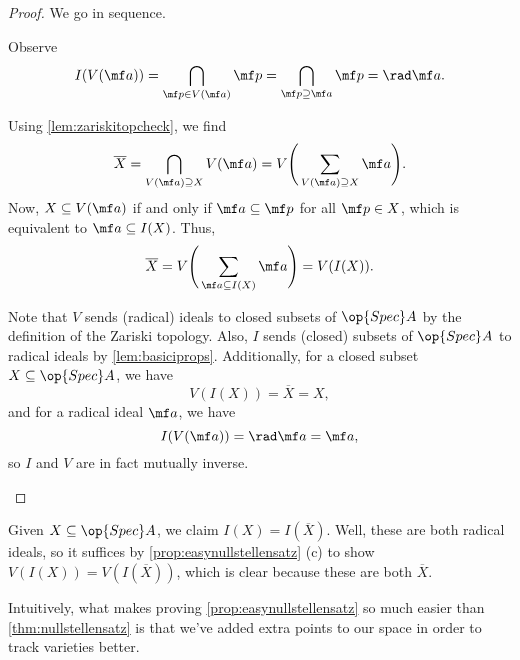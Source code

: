 \documentclass[../notes.tex]{subfiles}
\begin{document}
\begin{proof}
	We go in sequence.
	\begin{listalph}
		\item Observe
		\[I(V(\mf a))=\bigcap_{\mf p\in V(\mf a)}\mf p=\bigcap_{\mf p\supseteq\mf a}\mf p=\rad\mf a.\]
		\item Using \autoref{lem:zariskitopcheck}, we find
		\[\overline X=\bigcap_{V(\mf a)\supseteq X}V(\mf a)=V\Bigg(\sum_{V(\mf a)\supseteq X}\mf a\Bigg).\]
		Now, $X\subseteq V(\mf a)$ if and only if $\mf a\subseteq\mf p$ for all $\mf p\in X$, which is equivalent to $\mf a\subseteq I(X)$. Thus,
		\[\overline X=V\Bigg(\sum_{\mf a\subseteq I(X)}\mf a\Bigg)=V(I(X)).\]
		\item Note that $V$ sends (radical) ideals to closed subsets of $\op{Spec}A$ by the definition of the Zariski topology. Also, $I$ sends (closed) subsets of $\op{Spec}A$ to radical ideals by \autoref{lem:basiciprops}. Additionally, for a closed subset $X\subseteq\op{Spec}A$, we have
		\[V(I(X))=\overline X=X,\]
		and for a radical ideal $\mf a$, we have
		\[I(V(\mf a))=\rad\mf a=\mf a,\]
		so $I$ and $V$ are in fact mutually inverse.
		\qedhere
	\end{listalph}
\end{proof}
\begin{remark}
	Given $X\subseteq\op{Spec}A$, we claim $I(X)=I(\overline X)$. Well, these are both radical ideals, so it suffices by \autoref{prop:easynullstellensatz} (c) to show $V(I(X))=V(I(\overline X))$, which is clear because these are both $\overline X$.
\end{remark}
\begin{remark}
	Intuitively, what makes proving \autoref{prop:easynullstellensatz} so much easier than \autoref{thm:nullstellensatz} is that we've added extra points to our space in order to track varieties better.
\end{remark}
\end{document}
